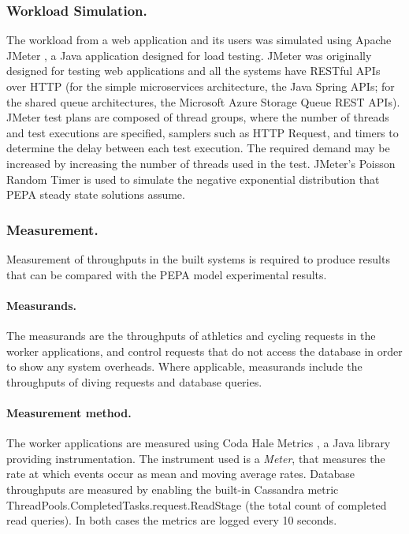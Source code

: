 \subsubsection{Workload Simulation.}  The workload from a web application and its users was simulated using Apache JMeter \cite{RN1074}, a Java application designed for load testing.  JMeter was originally designed for testing web applications and all the systems have RESTful APIs over HTTP (for the simple microservices architecture, the Java Spring APIs; for the shared queue architectures, the Microsoft Azure Storage Queue REST APIs).  JMeter test plans are composed of thread groups, where the number of threads and test executions are specified, samplers such as HTTP Request, and timers to determine the delay between each test execution.  The required demand may be increased by increasing the number of threads used in the test.  JMeter's Poisson Random Timer is used to simulate the negative exponential distribution \cite{RN80} that PEPA steady state solutions assume.

\subsubsection{Measurement.}  Measurement of throughputs in the built systems is required to produce results that can be compared with the PEPA model experimental results.

\paragraph{Measurands.} The measurands are the throughputs of athletics and cycling requests in the worker applications, and control requests that do not access the database in order to show any system overheads.  Where applicable, measurands include the throughputs of diving requests and database queries.

\paragraph{Measurement method.}  The worker applications are measured using Coda Hale Metrics \cite{RN1079}, a Java library providing instrumentation.  The instrument used is a {\itshape Meter}, that measures the rate at which events occur as mean and moving average rates.  Database throughputs are measured by enabling the built-in Cassandra metric ThreadPools.CompletedTasks.request.ReadStage (the total count of completed read queries).  In both cases the metrics are logged every 10 seconds.

